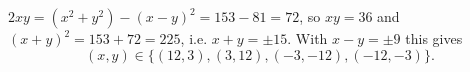 $2xy=(x^2+y^2)-(x-y)^2=153-81=72$, so $xy=36$ and $(x+y)^2=153+72=225$, i.e. $x+y=\pm15$. With $x-y=\pm9$ this gives
\[(x,y)\in\boxed{\{(12,3),(3,12),(-3,-12),(-12,-3)\}}.\]
